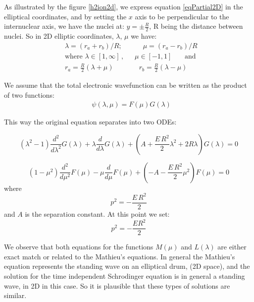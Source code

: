 As illustrated by the figure  \ref{h2ion2d}, we express equation \eqref{eqPartial2D} in the elliptical coordinates, and by setting the $ x $ axis to be perpendicular to the internuclear axis, we have the nuclei at: $ y = \pm \frac{R}{2}  $, R being the distance between nuclei. So in  2D elliptic coordinates, $ \lambda $, $ \mu $ we have:
\begin{equation}\label{variables1}
\begin{split}
& \lambda = \left(r_a + r_b\right)/R;\,\,\,\,\,\,\,\,\,\,\,\,\,\,\,\,\,\,\mu =  \left(r_a - r_b\right)/R  \\[1em]
& \text{where } \lambda \in \left[1,\infty\right]\,,\,\,\,\,\,\,\,\,\,\mu \in \left[ -1, 1 \right]\,\,\,\,\,\,\,\,\,\text{ and } \\[.8em] 
& r_a = \frac{R}{2}\left(\lambda + \mu \right)\,\,\,\,\,\,\,\,\,\,\,\,\,\,\,\,\,\,\,\,\,\, r_b = \frac{R}{2}\left(\lambda - \mu \right)
\end{split}
\end{equation}

We assume that the total electronic wavefunction can be written as the product of two functions:
\begin{equation}\label{variables2}
\begin{split}
& \psi(\lambda,\mu) = F(\mu)G(\lambda)
\end{split}
\end{equation}

This way the original equation separates into two ODEs:

\begin{equation}\label{L2-1}
\left(\lambda^2 - 1 \right) \frac{d^2}{ d\lambda^2 }G(\lambda) + \lambda\frac{ d}{d\lambda }G (\lambda)  + \left(A + \frac{E\,R^2}{2}\lambda^2 + 2R\lambda  \right)G (\lambda) = 0  
\end{equation}

\begin{equation}
 \left(1 - \mu^2 \right) \frac{d^2}{ d\mu^2 }F(\mu) - \mu\frac{ d }{d\mu }F(\mu) +  \left(-A -  \frac{E\,R^2}{2}\mu^2  \right)F(\mu) = 0
\end{equation}
where
\begin{equation}\label{eqP}
p^2 = -\frac{E\,R^2}{2}
\end{equation}
and $ A $ is the separation constant. At this point we set:
\begin{equation}
p^2 = -\frac{ER^2}{2}
\end{equation}

We observe that both equations for the functions $ M(\mu) $ and $ L(\lambda) $ are either exact match or related to the Mathieu's equations. In general the Mathieu's equation represents the standing wave on an elliptical drum, (2D space), and the solution for the time independent Schrodinger equation is in general a standing wave, in 2D in this case. So it is plausible that these types of solutions are similar.

